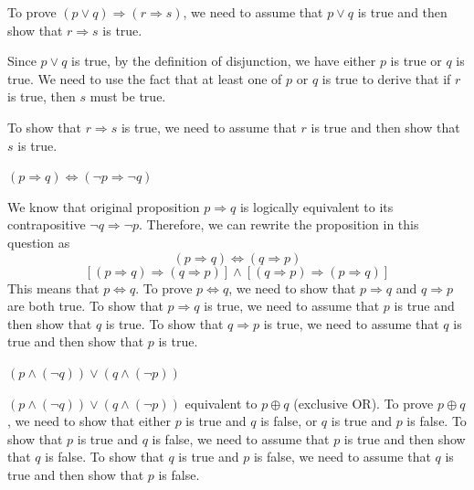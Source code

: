 \begin{mysolution}
    To prove $(p \vee q) \Rightarrow (r \Rightarrow s)$, we need to assume that $p \vee q$ is true and then show that $r \Rightarrow s$ is true.

    Since $p \vee q$ is true, by the definition of disjunction, we have either $p$ is true or $q$ is true. We need to use the fact that at least one of $p$ or $q$ is true to derive that if $r$ is true, then $s$ must be true. 

    To show that $r \Rightarrow s$ is true, we need to assume that $r$ is true and then show that $s$ is true. 
\end{mysolution}

\begin{chapex}
$(p \Rightarrow q) \Leftrightarrow (\neg p \Rightarrow \neg q)$
\end{chapex}

\begin{mysolution}
    We know that original proposition $p \Rightarrow q$ is logically equivalent to its contrapositive $\neg q \Rightarrow \neg p$. Therefore, we can rewrite the proposition in this question as
    \[(p \Rightarrow q) \Leftrightarrow (q \Rightarrow p)\]
    \[[(p \Rightarrow q) \Rightarrow (q \Rightarrow p)] \wedge [(q \Rightarrow p) \Rightarrow (p \Rightarrow q)]\]
    This means that $p \Leftrightarrow q$. To prove $p \Leftrightarrow q$, we need to show that $p \Rightarrow q$ and $q \Rightarrow p$ are both true. To show that $p \Rightarrow q$ is true, we need to assume that $p$ is true and then show that $q$ is true. To show that $q \Rightarrow p$ is true, we need to assume that $q$ is true and then show that $p$ is true.
\end{mysolution}

\begin{chapex}
\label{cqStructureProofEnd}
$(p \wedge (\neg q)) \vee (q \wedge (\neg p))$
\end{chapex}

\begin{mysolution}
    $(p \wedge (\neg q)) \vee (q \wedge (\neg p))$ equivalent to $p \oplus q$ (exclusive OR). To prove $p \oplus q$, we need to show that either $p$ is true and $q$ is false, or $q$ is true and $p$ is false. To show that $p$ is true and $q$ is false, we need to assume that $p$ is true and then show that $q$ is false. To show that $q$ is true and $p$ is false, we need to assume that $q$ is true and then show that $p$ is false.
\end{mysolution}

